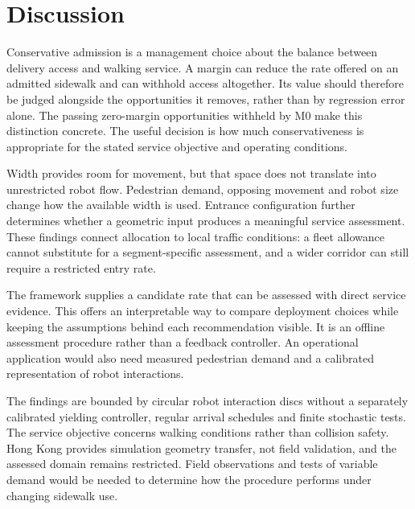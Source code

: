 \documentclass[NewProceedings,letterpaper]{ascelike-new}
\begin{document}
\begin{table}[!htbp]
\centering\caption{Operating-condition tests at 4~robots/min. Passing seeds are out of 30; each setting has its own baseline. Narrow: $W=1.75$~m, $q_p=21$~ped/min. Wide: $W=2.4$~m, $q_p=43.2$~ped/min. Radii are those used in the simulations.}
\label{tab:sensitivity}\small\setlength{\tabcolsep}{8pt}

\end{table}

\FloatBarrier
{}
\section{Discussion}
Conservative admission is a management choice about the balance between delivery access and walking service. A margin can reduce the rate offered on an admitted sidewalk and can withhold access altogether. Its value should therefore be judged alongside the opportunities it removes, rather than by regression error alone. The passing zero-margin opportunities withheld by M0 make this distinction concrete. The useful decision is how much conservativeness is appropriate for the stated service objective and operating conditions.

Width provides room for movement, but that space does not translate into unrestricted robot flow. Pedestrian demand, opposing movement and robot size change how the available width is used. Entrance configuration further determines whether a geometric input produces a meaningful service assessment. These findings connect allocation to local traffic conditions: a fleet allowance cannot substitute for a segment-specific assessment, and a wider corridor can still require a restricted entry rate.

The framework supplies a candidate rate that can be assessed with direct service evidence. This offers an interpretable way to compare deployment choices while keeping the assumptions behind each recommendation visible. It is an offline assessment procedure rather than a feedback controller. An operational application would also need measured pedestrian demand and a calibrated representation of robot interactions.

The findings are bounded by circular robot interaction discs without a separately calibrated yielding controller, regular arrival schedules and finite stochastic tests. The service objective concerns walking conditions rather than collision safety. Hong Kong provides simulation geometry transfer, not field validation, and the assessed domain remains restricted. Field observations and tests of variable demand would be needed to determine how the procedure performs under changing sidewalk use.
\end{document}
